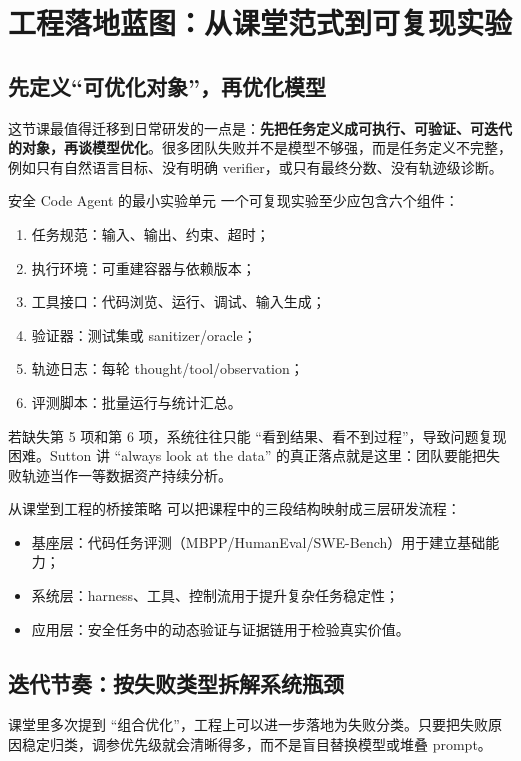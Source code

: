 \section{工程落地蓝图：从课堂范式到可复现实验}

\subsection{先定义“可优化对象”，再优化模型}
这节课最值得迁移到日常研发的一点是：\textbf{先把任务定义成可执行、可验证、可迭代的对象，再谈模型优化}。很多团队失败并不是模型不够强，而是任务定义不完整，例如只有自然语言目标、没有明确 verifier，或只有最终分数、没有轨迹级诊断。

\begin{importantbox}{安全 Code Agent 的最小实验单元}
一个可复现实验至少应包含六个组件：
\begin{enumerate}
    \item 任务规范：输入、输出、约束、超时；
    \item 执行环境：可重建容器与依赖版本；
    \item 工具接口：代码浏览、运行、调试、输入生成；
    \item 验证器：测试集或 sanitizer/oracle；
    \item 轨迹日志：每轮 thought/tool/observation；
    \item 评测脚本：批量运行与统计汇总。
\end{enumerate}
\end{importantbox}

若缺失第 5 项和第 6 项，系统往往只能 ``看到结果、看不到过程''，导致问题复现困难。Sutton 讲 ``always look at the data'' 的真正落点就是这里：团队要能把失败轨迹当作一等数据资产持续分析。

\begin{knowledgebox}{从课堂到工程的桥接策略}
可以把课程中的三段结构映射成三层研发流程：
\begin{itemize}
    \item 基座层：代码任务评测（MBPP/HumanEval/SWE-Bench）用于建立基础能力；
    \item 系统层：harness、工具、控制流用于提升复杂任务稳定性；
    \item 应用层：安全任务中的动态验证与证据链用于检验真实价值。
\end{itemize}
\end{knowledgebox}

\subsection{迭代节奏：按失败类型拆解系统瓶颈}
课堂里多次提到 ``组合优化''，工程上可以进一步落地为失败分类。只要把失败原因稳定归类，调参优先级就会清晰得多，而不是盲目替换模型或堆叠 prompt。

